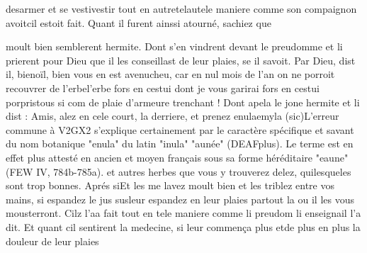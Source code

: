 \documentclass{article}
\begin{document}
\begin{pages}
                  desarmer et se vestivestir tout en 
                  autretelautele maniere comme 
                  son compaignon
                     avoitcil estoit fait. Quant il furent ainssi atourné, sachiez que
               
                  moult bien semblerent hermite. Dont s’en vindrent devant le preudomme et li prierent pour Dieu que il les conseillast de
               leur plaies, se il savoit. Par Dieu, dist il, 
                     bienoïl, bien vous en est 
                     avenucheu, car en nul mois de l’an on ne porroit recouvrer de 
                     l’erbel'erbe fors en cestui dont je vous garirai 
                     fors en cestui 
                           porpristous si com de plaie d'armeure trenchant ! Dont apela le jone
                  hermite et li dist : 
                     Amis, alez en cele court, la derriere, et prenez 
                     enulaemyla (sic)L'erreur commune à V2GX2 s'explique certainement
                     par le caractère spécifique et savant du nom botanique "enula" du latin "inula"
                     "aunée" (DEAFplus). Le terme est en effet plus attesté en ancien et moyen
                     français sous sa forme héréditaire "eaune" (FEW IV, 784b-785a).  et
                  autres herbes que vous y trouverez delez, 
                     quilesqueles sont trop bonnes. 
                     Aprés siEt les me lavez moult bien et les triblez entre vos mains, si 
                     espandez le jus susleur espandez en leur plaies partout la ou il les vous mousterront. Cilz 
                  l’aa fait tout en tele maniere comme 
                  li preudom li
                     enseignail l'a dit. Et quant cil sentirent la medecine, si leur commença 
                  plus etde plus en plus la douleur 
                  de leur plaies
               

\end{pages}
\end{document}
